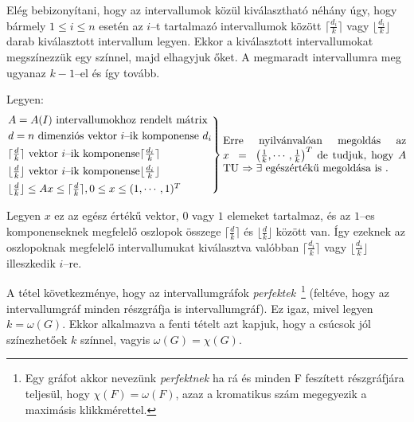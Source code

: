 Elég bebizonyítani, hogy az intervallumok közül kiválasztható néhány úgy, hogy
bármely $1 \leq i \leq n$ esetén az $i$--t tartalmazó intervallumok között
$\lceil \frac{d_i}{k} \rceil$ vagy $\lfloor \frac{d_i}{k} \rfloor$ darab
kiválasztott intervallum legyen. Ekkor a kiválasztott intervallumokat
megszínezzük egy színnel, majd elhagyjuk őket. A megmaradt intervallumra meg
ugyanaz $k-1$--el és így tovább.

Legyen:
\[\begin{rcases}
A=A(I) \mbox{ intervallumokhoz rendelt mátrix}\\
d = n \text{ dimenziós vektor } i \text{--ik komponense } d_i \\
\lceil \frac{d}{k} \rceil \text{ vektor } i \text{--ik komponense} \lceil \frac{d_i}{k} \rceil \\
\lfloor \frac{d}{k} \rfloor \text{ vektor } i \text{--ik komponense} \lfloor
\frac{d_i}{k} \rfloor \\
\lfloor \frac{d}{k} \rfloor \leq Ax \leq \lceil \frac{d}{k} \rceil, 0 \leq x
\leq (1,\cdots, 1)^T \end{rcases} \parbox[L]{6cm}{Erre nyilvánvalóan megoldás az
$x~=~\left( \frac{1}{k}, \cdots, \frac{1}{k} \right)^T$ de tudjuk, hogy $A$ TU
$\Rightarrow \exists$ egészértékű megoldása is .}
\]

Legyen $x$ ez az egész értékű vektor, $0$ vagy $1$ elemeket tartalmaz, és az
$1$--es komponenseknek megfelelő oszlopok összege $\lceil \frac{d}{k} \rceil$ és
$ \lfloor \frac{d}{k} \rfloor$ között van. Így ezeknek az oszlopoknak megfelelő
intervallumukat kiválasztva valóbban $\lceil \frac{d_i}{k} \rceil$ vagy $
\lfloor \frac{d_i}{k} \rfloor$ illeszkedik $i$--re.

A tétel következménye, hogy az intervallumgráfok \emph{perfektek}~\footnote{ Egy
gráfot akkor nevezünk \emph{perfektnek} ha rá és minden F feszített részgráfjára
teljesül, hogy $\chi(F) = \omega(F)$, azaz a kromatikus szám megegyezik a
maximásis klikkmérettel.} (feltéve, hogy az intervallumgráf minden részgráfja is
intervallumgráf). Ez igaz, mivel legyen $k=\omega(G)$. Ekkor alkalmazva a fenti
tételt azt kapjuk, hogy a csúcsok jól színezhetőek $k$ színnel, vagyis
$\omega(G)=\chi(G)$.